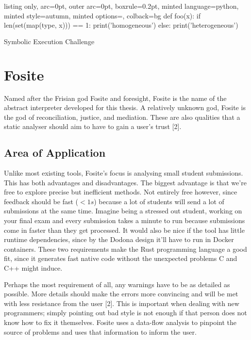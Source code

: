 \documentclass[]{article}
\begin{document}
\begin{code}
  \begin{tcblisting}{listing only, 
  arc=0pt,
  outer arc=0pt, 
  boxrule=0.2pt,
  minted language=python,
  minted style=autumn,
  minted options={},
  colback=bg }
def foo(x):
  if len(set(map(type, x))) == 1:
    print('homogeneous')
  else:
    print('heterogeneous')
\end{tcblisting}
\caption{Symbolic Execution Challenge} \label{smp:symb2}
\end{code}

\section{Fosite}\label{fosite}

Named after the Frisian god Fosite and foresight, Fosite is the name of
the abstract interpreter developed for this thesis. A relatively unknown
god, Fosite is the god of reconciliation, justice, and mediation. These
are also qualities that a static analyser should aim to have to gain a
user's trust {[}2{]}.

\subsection{Area of Application}\label{area-of-application}

Unlike most existing tools, Fosite's focus is analysing small student
submissions. This has both advantages and disadvantages. The biggest
advantage is that we're free to explore precise but inefficient methods.
Not entirely free however, since feedback should be fast (\(< 1s\))
because a lot of students will send a lot of submissions at the same
time. Imagine being a stressed out student, working on your final exam
and every submission takes a minute to run because submissions come in
faster than they get processed. It would also be nice if the tool has
little runtime dependencies, since by the Dodona design it'll have to
run in Docker containers. These two requirements make the Rust
programming language a good fit, since it generates fast native code
without the unexpected problems C and C++ might induce.

Perhaps the most requirement of all, any warnings have to be as detailed
as possible. More details should make the errors more convincing and
will be met with less resistance from the user {[}2{]}. This is
important when dealing with new programmers; simply pointing out bad
style is not enough if that person does not know how to fix it
themselves. Fosite uses a data-flow analysis to pinpoint the source of
problems and uses that information to inform the user.
\end{document}
